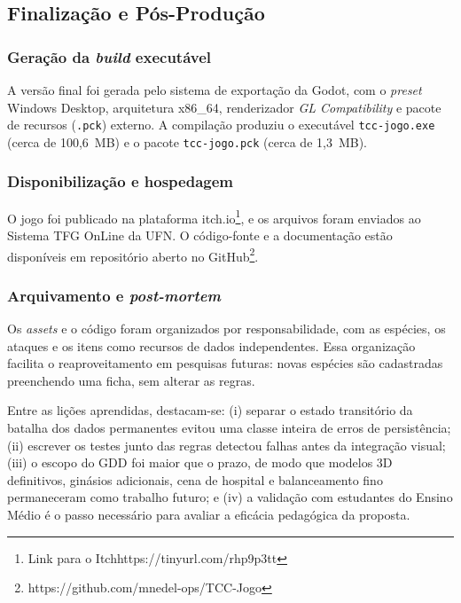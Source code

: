 \subsection{Finalização e Pós-Produção}

\subsubsection{Geração da \textit{build} executável}
A versão final foi gerada pelo sistema de exportação da Godot, com o \textit{preset} Windows Desktop, arquitetura x86\_64, renderizador \textit{GL Compatibility} e pacote de recursos (\texttt{.pck}) externo. A compilação produziu o executável \texttt{tcc-jogo.exe} (cerca de 100,6~MB) e o pacote \texttt{tcc-jogo.pck} (cerca de 1,3~MB).

\subsubsection{Disponibilização e hospedagem}
O jogo foi publicado na plataforma itch.io\footnote{Link para o Itchhttps://tinyurl.com/rhp9p3tt}, e os arquivos foram enviados ao Sistema TFG OnLine da UFN. O código-fonte e a documentação estão disponíveis em repositório aberto no GitHub\footnote{https://github.com/mnedel-ops/TCC-Jogo}.

\subsubsection{Arquivamento e \textit{post-mortem}}
Os \textit{assets} e o código foram organizados por responsabilidade, com as espécies, os ataques e os itens como recursos de dados independentes. Essa organização facilita o reaproveitamento em pesquisas futuras: novas espécies são cadastradas preenchendo uma ficha, sem alterar as regras.

Entre as lições aprendidas, destacam-se: (i) separar o estado transitório da batalha dos dados permanentes evitou uma classe inteira de erros de persistência; (ii) escrever os testes junto das regras detectou falhas antes da integração visual; (iii) o escopo do GDD foi maior que o prazo, de modo que modelos 3D definitivos, ginásios adicionais, cena de hospital e balanceamento fino permaneceram como trabalho futuro; e (iv) a validação com estudantes do Ensino Médio é o passo necessário para avaliar a eficácia pedagógica da proposta.